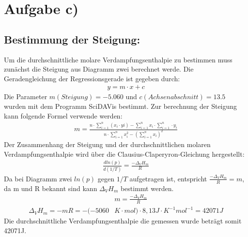 \section{Aufgabe c)}
\subsection{Bestimmung der Steigung:}
Um die durchschnittliche molare Verdampfungsenthalpie zu bestimmen muss zunächst die Steigung aus 
Diagramm zwei berechnet werde.
Die Geradengleichung der Regressionsgerade ist gegeben durch:
\begin{align*}
    y = m \cdot x + c
\end{align*} 
Die Parameter $m(Steigung)=-5.060$ und $c(Achsenabschnitt)=13.5$ wurden mit dem Programm SciDAVis bestimmt. Zur berechnung 
der Steigung kann folgende Formel verwende werden:
\begin{align*}
    m = \frac{n \cdot \sum\limits^{n}_{i=1}(x_i \cdot yi) - \sum\limits^{n}_{i=1}x_i \cdot \sum\limits^{n}_{i=1} \cdot y_i} 
    {n \cdot \sum\limits^{n}_{i=1}x_i^2-(\sum\limits^{n}_{i=1}x_i)^2}
\end{align*} 
Der Zusammenhang der Steigung und der durchschnittlichen molaren Verdampfungsenthalpie wird über die 
Clausius-Claperyron-Gleichung hergestellt:
\begin{align*}
    \frac{d ln (p)}{d(1/T)} = \frac{-\Delta_V H_m}{R}
\end{align*}
Da bei Diagramm zwei $ln(p)$ gegen $1/T$ aufgetragen ist, entspricht $\frac{-\Delta_V H_m}{R}=m$, da m und R bekannt
sind kann $\Delta_V H_m$ bestimmt werden.
\begin{align*}
    &m = \frac{-\Delta_V H_m}{R} \\
    \Delta_V H_m = - m R = - (-5060 &K \cdot mol) \cdot 8,13 J \cdot K^{-1}  mol^{-1} = 42071J  
\end{align*} 
Die durchschnittliche Verdampfungsenthalpie die gemessen wurde beträgt somit 42071J.
\clearpage